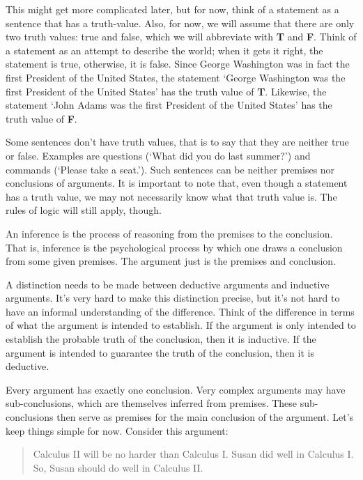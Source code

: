 \documentclass[../logic-text.tex]{subfiles}
\begin{document}
This might get more complicated later, but for now, think of a statement as a sentence that has a truth-value.
Also, for now, we will assume that there are only two truth values: true and false, which we will abbreviate with \textbf{T} and \textbf{F}.
Think of a statement as an attempt to describe the world; when it gets it right, the statement is true, otherwise, it is false.
Since George Washington was in fact the first President of the United States, the statement \enquote*{George Washington was the first President of the United States} has the truth value of \textbf{T}. 
Likewise, the statement \enquote*{John Adams was the first President of the United States} has the truth value of \textbf{F}.

Some sentences don't have truth values, that is to say that they are neither true or false.
Examples are questions (\enquote*{What did you do last summer?}) and commands (\enquote*{Please take a seat.}).
Such sentences can be neither premises nor conclusions of arguments. 
It is important to note that, even though a statement has a truth value, we may not necessarily know what that truth value is.
The rules of logic will still apply, though. 

An inference is the process of reasoning from the premises to the conclusion. That is, inference is the psychological process by which one draws a conclusion from some given premises. The argument just is the premises and conclusion.

A distinction needs to be made between deductive arguments and inductive arguments.
It's very hard to make this distinction precise, but it's not hard to have an informal understanding of the difference.
Think of the difference in terms of what the argument is intended to establish.
If the argument is only intended to establish the probable truth of the conclusion, then it is inductive.
If the argument is intended to guarantee the truth of the conclusion, then it is deductive.

Every argument has exactly one conclusion.
Very complex arguments may have sub-conclusions, which are themselves inferred from premises.
These sub-conclusions then serve as premises for the main conclusion of the argument. Let's keep things simple for now. Consider this argument:

\begin{quote}
Calculus II will be no harder than Calculus I. Susan did well in
Calculus I. So, Susan should do well in Calculus II.
\end{quote}
\end{document}
